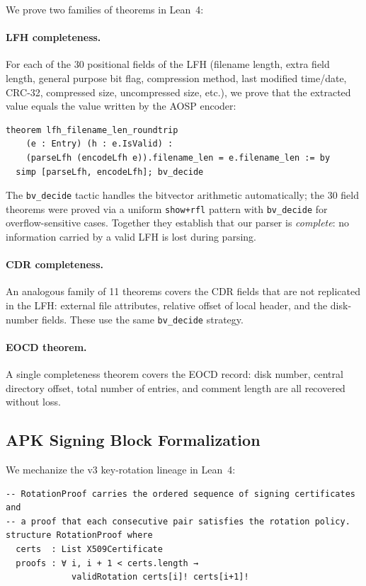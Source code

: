 \documentclass[runningheads]{llncs}
\begin{document}
We prove two families of theorems in Lean~4:

\paragraph{LFH completeness.}
For each of the 30 positional fields of the LFH (filename length, extra field
length, general purpose bit flag, compression method, last modified time/date,
CRC-32, compressed size, uncompressed size, etc.), we prove that the extracted
value equals the value written by the AOSP encoder:

\begin{lstlisting}[language=lean,mathescape=true]
theorem lfh_filename_len_roundtrip
    (e : Entry) (h : e.IsValid) :
    (parseLfh (encodeLfh e)).filename_len = e.filename_len := by
  simp [parseLfh, encodeLfh]; bv_decide
\end{lstlisting}

The \texttt{bv\_decide} tactic handles the bitvector arithmetic automatically;
the 30 field theorems were proved via a uniform \texttt{show+rfl} pattern with
\texttt{bv\_decide} for overflow-sensitive cases.  Together they establish that
our parser is \emph{complete}: no information carried by a valid LFH is lost
during parsing.

\paragraph{CDR completeness.}
An analogous family of 11 theorems covers the CDR fields that are not replicated
in the LFH: external file attributes, relative offset of local header, and the
disk-number fields.  These use the same \texttt{bv\_decide} strategy.

\paragraph{EOCD theorem.}
A single completeness theorem covers the EOCD record: disk number, central
directory offset, total number of entries, and comment length are all recovered
without loss.

\subsection{APK Signing Block Formalization}

We mechanize the v3 key-rotation lineage in Lean~4:

\begin{lstlisting}
-- RotationProof carries the ordered sequence of signing certificates and
-- a proof that each consecutive pair satisfies the rotation policy.
structure RotationProof where
  certs  : List X509Certificate
  proofs : ∀ i, i + 1 < certs.length →
             validRotation certs[i]! certs[i+1]!
\end{lstlisting}
\end{document}
